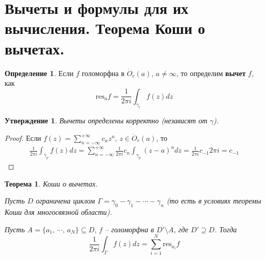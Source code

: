 \documentclass[a4paper,12pt]{article}
\theoremstyle{plain}
\newtheorem{theorem}{Теорема}[section]
\newtheorem{proposition}{Утверждение}[section]
\theoremstyle{definition}
\newtheorem{definition}{Определение}[section]
\theoremstyle{remark}
\begin{document}
\section{Вычеты и формулы для их вычисления. Теорема Коши о вычетах.}
\begin{definition}
	Если $f$ голоморфна в $\dot{O}_r(a),\, a \neq \infty$, то определим \textbf{вычет} $f$, как
	\[
		\text{res}_af = \frac{1}{2\pi i}\int_{\gamma_r}f(z)dz
	\]
\end{definition}

\begin{proposition}
	Вычеты определены корректно (независят от $\gamma$).
\end{proposition}

\begin{proof}
	Если $f(z) = \sum_{n = -\infty}^{+\infty} c_nz^n,\, z \in \dot{O}_r(a)$, то
	\begin{align*}
		\frac{1}{2\pi i}\int_{\gamma_\rho}f(z)dz = \sum_{n = -\infty}^{+\infty}\frac{1}{2\pi i}c_n\int_{\gamma_\rho}(z - a)^ndz = \frac{1}{2\pi i}c_{-1}2\pi i = c_{-1}
	\end{align*}
\end{proof}

\begin{theorem}
	Коши о вычетах.

	Пусть $D$ ограничена циклом $\Gamma = \gamma_0 - \gamma_1 - \cdots - \gamma_n$ (то есть в условиях теоремы Коши для многосвязной области).

	Пусть $A = \{a_1,\,\cdots,\, a_N\} \subseteq D,\, f$ -- голоморфна в $D' \setminus A$, где $D' \supseteq D$. Тогда
	\[
		\frac{1}{2\pi i}\int_\Gamma f(z)dz = \sum_{i = 1}^N \text{res}_{a_i} f
	\]
\end{theorem}
\end{document}
